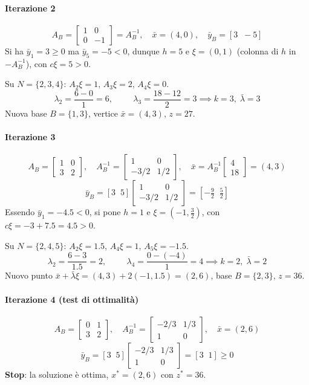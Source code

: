 \documentclass[12pt]{extarticle} %
\begin{document}
\paragraph{Iterazione 2}
\[
A_B = \begin{bmatrix} 1 & 0\\ 0 & -1\end{bmatrix} = A_B^{-1}, \quad \bar{x} = (4,0), \quad \bar{y}_B = [3 \;\; -5]
\]
Si ha $\bar{y}_1 = 3 \ge 0$ ma $\bar{y}_5 = -5 < 0$, dunque $h = 5$ e $\xi = (0,1)$ (colonna di $h$ in $-A_B^{-1}$), con $c\xi = 5 > 0$.

\noindent Su $N = \{2,3,4\}$: $A_2\xi = 1$, $A_3\xi = 2$, $A_4\xi = 0$.
\[
\lambda_2 = \frac{6-0}{1} = 6, \hspace{1cm} \lambda_3 = \frac{18-12}{2} = 3 \implies k = 3, \; \bar{\lambda} = 3
\]
Nuova base $B = \{1,3\}$, vertice $\bar{x} = (4,3)$, $z = 27$.

\paragraph{Iterazione 3}
\[
A_B = \begin{bmatrix} 1 & 0\\ 3 & 2\end{bmatrix}, \quad A_B^{-1} = \begin{bmatrix} 1 & 0\\ -3/2 & 1/2\end{bmatrix}, \quad \bar{x} = A_B^{-1}\begin{bmatrix}4\\18\end{bmatrix} = (4,3)
\]
\[
\bar{y}_B = [3 \;\; 5]\begin{bmatrix} 1 & 0\\ -3/2 & 1/2\end{bmatrix} = \left[-\tfrac{9}{2} \;\; \tfrac{5}{2}\right]
\]
Essendo $\bar{y}_1 = -4.5 < 0$, si pone $h = 1$ e $\xi = \left(-1, \tfrac{3}{2}\right)$, con $c\xi = -3 + 7.5 = 4.5 > 0$.

\noindent Su $N = \{2,4,5\}$: $A_2\xi = 1.5$, $A_4\xi = 1$, $A_5\xi = -1.5$.
\[
\lambda_2 = \frac{6-3}{1.5} = 2, \hspace{1cm} \lambda_4 = \frac{0-(-4)}{1} = 4 \implies k = 2, \; \bar{\lambda} = 2
\]
Nuovo punto $\bar{x} + \bar{\lambda}\xi = (4,3) + 2(-1, 1.5) = (2,6)$, base $B = \{2,3\}$, $z = 36$.

\paragraph{Iterazione 4 (test di ottimalità)}
\[
A_B = \begin{bmatrix} 0 & 1\\ 3 & 2\end{bmatrix}, \quad A_B^{-1} = \begin{bmatrix} -2/3 & 1/3\\ 1 & 0\end{bmatrix}, \quad \bar{x} = (2,6)
\]
\[
\bar{y}_B = [3 \;\; 5]\begin{bmatrix} -2/3 & 1/3\\ 1 & 0\end{bmatrix} = [3 \;\; 1] \ge 0
\]
\textbf{Stop}: la soluzione è ottima, $x^* = (2,6)$ con $z^* = 36$.
\end{document}
